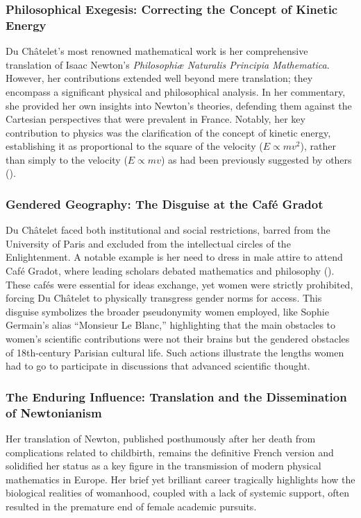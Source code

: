 \subsubsection{Philosophical Exegesis: Correcting the Concept of Kinetic Energy}
Du Châtelet's most renowned mathematical work is her comprehensive translation of Isaac Newton's \textit{Philosophiæ Naturalis Principia Mathematica}. However, her contributions extended well beyond mere translation; they encompass a significant physical and philosophical analysis. In her commentary, she provided her own insights into Newton's theories, defending them against the Cartesian perspectives that were prevalent in France. Notably, her key contribution to physics was the clarification of the concept of kinetic energy, establishing it as proportional to the square of the velocity ($E\propto mv^2$), rather than simply to the velocity ($E\propto mv$) as had been previously suggested by others (\cite{Zinsser2006}).
\subsubsection{Gendered Geography: The Disguise at the Café Gradot}
Du Châtelet faced both institutional and social restrictions, barred from the University of Paris and excluded from the intellectual circles of the Enlightenment. A notable example is her need to dress in male attire to attend Café Gradot, where leading scholars debated mathematics and philosophy (\cite{Sperling2017}). These cafés were essential for ideas exchange, yet women were strictly prohibited, forcing Du Châtelet to physically transgress gender norms for access. This disguise symbolizes the broader pseudonymity women employed, like Sophie Germain's alias ``Monsieur Le Blanc,'' highlighting that the main obstacles to women's scientific contributions were not their brains but the gendered obstacles of 18th-century Parisian cultural life. Such actions illustrate the lengths women had to go to participate in discussions that advanced scientific thought.
\subsubsection{The Enduring Influence: Translation and the Dissemination of Newtonianism}
Her translation of Newton, published posthumously after her death from complications related to childbirth, remains the definitive French version and solidified her status as a key figure in the transmission of modern physical mathematics in Europe. Her brief yet brilliant career tragically highlights how the biological realities of womanhood, coupled with a lack of systemic support, often resulted in the premature end of female academic pursuits.


